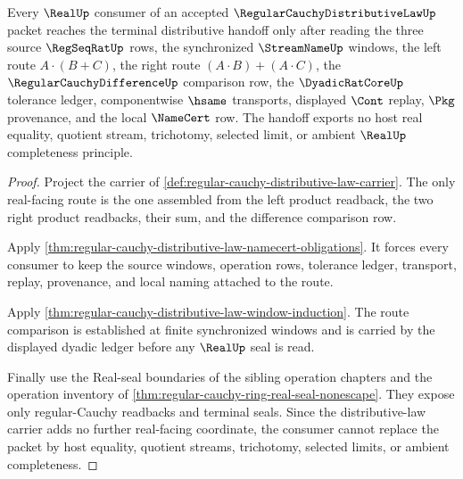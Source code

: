 \begin{theorem}
\label{thm:regular-cauchy-distributive-law-real-seal-handoff}
Every $\RealUp$ consumer of an accepted $\RegularCauchyDistributiveLawUp$ packet reaches the terminal distributive handoff only after reading the three source $\RegSeqRatUp$ rows, the synchronized $\StreamNameUp$ windows, the left route $A\cdot(B+C)$, the right route $(A\cdot B)+(A\cdot C)$, the $\RegularCauchyDifferenceUp$ comparison row, the $\DyadicRatCoreUp$ tolerance ledger, componentwise $\hsame$ transports, displayed $\Cont$ replay, $\Pkg$ provenance, and the local $\NameCert$ row. The handoff exports no host real equality, quotient stream, trichotomy, selected limit, or ambient $\RealUp$ completeness principle.
\end{theorem}
\begin{proof}
Project the carrier of \autoref{def:regular-cauchy-distributive-law-carrier}. The only real-facing route is the one assembled from the left product readback, the two right product readbacks, their sum, and the difference comparison row.

Apply \autoref{thm:regular-cauchy-distributive-law-namecert-obligations}. It forces every consumer to keep the source windows, operation rows, tolerance ledger, transport, replay, provenance, and local naming attached to the route.

Apply \autoref{thm:regular-cauchy-distributive-law-window-induction}. The route comparison is established at finite synchronized windows and is carried by the displayed dyadic ledger before any $\RealUp$ seal is read.

Finally use the Real-seal boundaries of the sibling operation chapters and the operation inventory of \autoref{thm:regular-cauchy-ring-real-seal-nonescape}. They expose only regular-Cauchy readbacks and terminal seals. Since the distributive-law carrier adds no further real-facing coordinate, the consumer cannot replace the packet by host equality, quotient streams, trichotomy, selected limits, or ambient completeness.
\end{proof}


